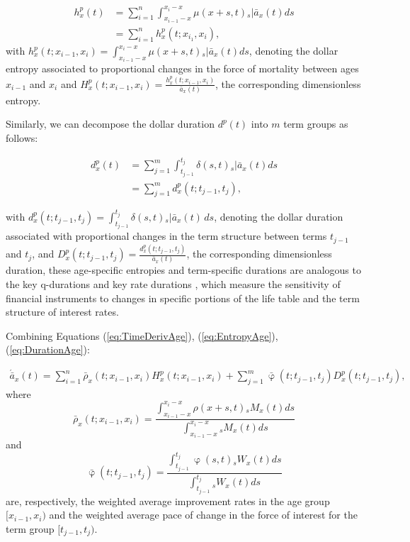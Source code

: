 \documentclass[12pt]{article}
\begin{document}
{\begin{equation} \label{eq:EntropyAge}
\begin{split}
{h}^{p}_{x}(t) &=  \sum_{i=1}^n\int_{x_{i-1}-x}^{x_i-x} \mu(x+s,t)   {}_s|\bar{a}_x(t) ds \\
&=  \sum_{i=1}^n {h}^{p}_{x}(t;x_{i_1},x_{i}),
\end{split}
\end{equation}
with ${h}^{p}_{x}(t;x_{i-1},x_{i})=\int_{x_{i-1}-x}^{x_i-x} \mu(x+s,t)   {}_s|\bar{a}_x(t) ds$, denoting the dollar entropy associated to proportional changes in the force of mortality between ages $x_{i-1}$ and $x_{i}$ and ${H}^{p}_{x}(t;x_{i-1},x_{i}) = \frac{{h}^{p}_{x}(t;x_{i-1},x_{i})}{\bar{a}_x(t)}$, the corresponding dimensionless entropy. 

Similarly, we can decompose the dollar duration $d^p(t)$ into $m$ term groups as follows:

\begin{equation}\label{eq:DurationAge}
\begin{split}
{d}^{p}_{x}(t) &= \sum_{j=1}^m\int_{t_{j-1}}^{t_j} \delta(s,t) {}_s|\bar{a}_x(t)ds \\
&= \sum_{j=1}^m {d}^{p}_{x}(t;t_{j-1},t_{j}),
\end{split}
\end{equation}


with ${d}^{p}_{x}(t;t_{j-1},t_{j}) = \int_{t_{j-1}}^{t_j} \delta(s,t) {}_s|\bar{a}_x(t) \, ds$, denoting the dollar duration associated with proportional changes in the term structure between terms $t_{j-1}$ and $t_{j}$, and ${D}^{p}_{x}(t;t_{j-1},t_{j}) = \frac{{d}^{p}_{x}(t;t_{j-1},t_{j})}{\bar{a}_x(t)}$, the corresponding dimensionless duration, these age-specific entropies and term-specific durations are analogous to the key q-durations \citep{li2012key} and key rate durations \citep{Ho1992}, which measure the sensitivity of financial instruments to changes in specific portions of the life table and the term structure of interest rates.



Combining Equations (\ref{eq:TimeDerivAge}), (\ref{eq:EntropyAge}), (\ref{eq:DurationAge}):  

\begin{equation}\label{eq:TimeDerivAge2}
\begin{split}
 \acute{\bar{a}}_x(t) = \sum_{i=1}^n\bar{\rho}_x(t;x_{i-1}, x_i){H}^{p}_x(t;x_{i-1}, x_i) +\sum_{j=1}^m\bar{\upvarphi}(t;t_{j-1},t_{j}){D}^{p}_x(t;t_{j-1},t_{j}),  
\end{split}
\end{equation}
where $$\bar{\rho}_x(t;x_{i-1}, x_i)= \frac{\int_{x_{i-1}-x}^{x_i-x} \rho(x+s,t) {}_sM_x(t)  ds}{\int_{x_{i-1}-x}^{x_i-x}  {}_sM_x(t)ds}$$ and 
$$\bar{\upvarphi}(t;t_{j-1},t_{j})= \frac{\int_{t_{j-1}}^{t_{j}} \upvarphi(s,t) {}_sW_x(t)  ds}{\int_{t_{j-1}}^{t_{j}} {}_sW_x(t) ds}$$ are, respectively, the weighted average improvement rates in the age group $[x_{i-1},x_{i})$ and the weighted average pace of change in the force of interest for the term group $[t_{j-1},t_{j})$. 





}
\end{document}
